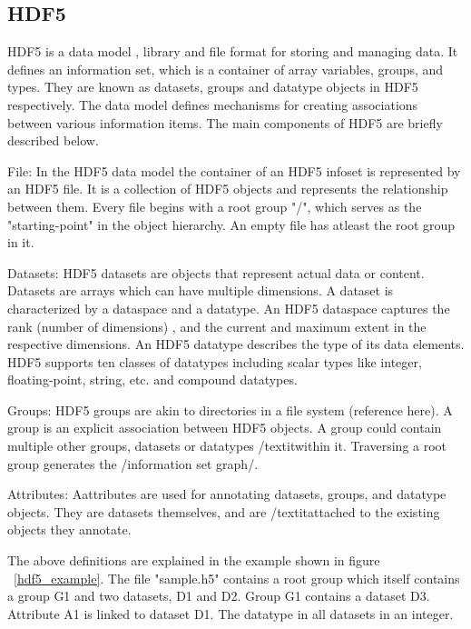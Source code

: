 \subsection{HDF5}
HDF5 is a data model , library and file format for storing and managing data. It defines an information set, which is a container of array variables, groups, and types. They are known as datasets, groups and datatype objects in HDF5 respectively. The data model defines mechanisms for creating associations between various information items. The main components of HDF5 are briefly described below.

File:
In the HDF5 data model the container of an HDF5 infoset
is represented by an HDF5 file. It is a collection of HDF5 objects and represents the relationship between them.
Every file begins with a root group "/", which serves as the "starting-point" in the object hierarchy. An empty file has atleast the root group in it.

Datasets:
HDF5 datasets are objects that represent actual data or content. Datasets are arrays which can have multiple dimensions. A dataset is characterized by a dataspace and a datatype. An HDF5 dataspace captures the rank (number of dimensions) , and the current and maximum extent in the respective dimensions. An HDF5 datatype describes the type of its data elements. 
HDF5 supports ten classes of datatypes including scalar types like integer, floating-point, string, etc. and compound datatypes. 

Groups:
HDF5 groups are akin to directories in a file system (reference here). A group is an explicit association between HDF5 objects. A group could contain multiple other groups, datasets or datatypes /textit{within} it. 
Traversing a root group generates the /information set graph/.

Attributes:
Aattributes are used for annotating datasets, groups, and datatype objects. They are datasets themselves, and are /textit{attached} to the existing objects they annotate. 

The above definitions are explained in the example shown in figure ~\ref{hdf5_example}. 
The file "sample.h5" contains a root group which itself contains a group G1 and two datasets, D1 and D2. Group G1 contains a dataset D3. Attribute A1 is linked to dataset D1. The datatype in all datasets in an integer. 


